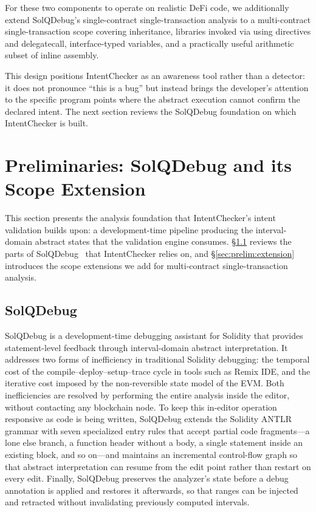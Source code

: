 \documentclass[pdflatex,sn-basic]{sn-jnl}%
\theoremstyle{thmstyleone}%
\theoremstyle{thmstyletwo}%
\theoremstyle{thmstylethree}%
\begin{document}
\smallskip
For these two components to operate on realistic DeFi code, we additionally extend SolQDebug's single-contract single-transaction analysis to a multi-contract single-transaction scope covering inheritance, libraries invoked via using directives and delegatecall, interface-typed variables, and a practically useful arithmetic subset of inline assembly.

\smallskip
This design positions IntentChecker as an awareness tool rather than a detector: it does not pronounce ``this is a bug'' but instead brings the developer's attention to the specific program points where the abstract execution cannot confirm the declared intent.
The next section reviews the SolQDebug foundation on which IntentChecker is built.

\section{Preliminaries: SolQDebug and its Scope Extension}\label{sec:prelim}

This section presents the analysis foundation that IntentChecker's intent validation builds upon: a development-time pipeline producing the interval-domain abstract states that the validation engine consumes.
§\ref{sec:prelim:foundations} reviews the parts of SolQDebug~\citep{solqdebug} that IntentChecker relies on, and §\ref{sec:prelim:extension} introduces the scope extensions we add for multi-contract single-transaction analysis.

\subsection{SolQDebug}\label{sec:prelim:foundations}

SolQDebug is a development-time debugging assistant for Solidity that provides statement-level feedback through interval-domain abstract interpretation.
It addresses two forms of inefficiency in traditional Solidity debugging: the temporal cost of the compile--deploy--setup--trace cycle in tools such as Remix IDE, and the iterative cost imposed by the non-reversible state model of the EVM.
Both inefficiencies are resolved by performing the entire analysis inside the editor, without contacting any blockchain node.
To keep this in-editor operation responsive as code is being written, SolQDebug extends the Solidity ANTLR grammar with seven specialized entry rules that accept partial code fragments---a lone else branch, a function header without a body, a single statement inside an existing block, and so on---and maintains an incremental control-flow graph so that abstract interpretation can resume from the edit point rather than restart on every edit.
Finally, SolQDebug preserves the analyzer's state before a debug annotation is applied and restores it afterwards, so that ranges can be injected and retracted without invalidating previously computed intervals.
\end{document}
